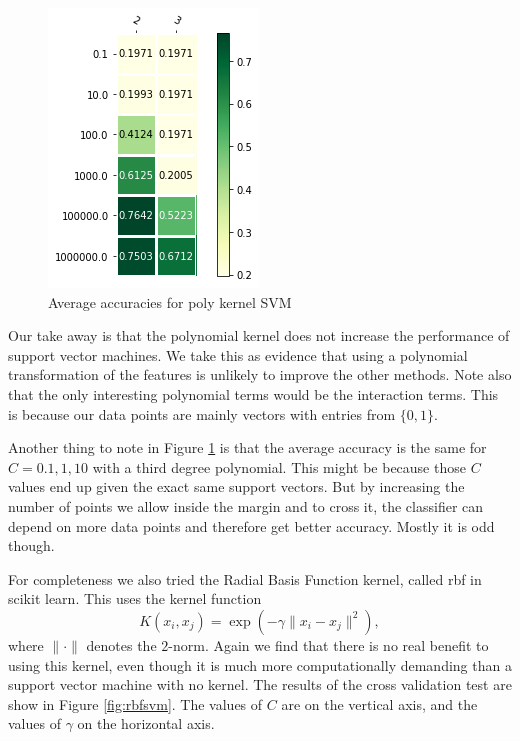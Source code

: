 \documentclass[parskip=half]{scrartcl}
\theoremstyle{definition}
\theoremstyle{remark}
\begin{document}
\begin{figure}[H]
\caption{Average accuracies for poly kernel SVM} \label{fig:polysvm}
\centering
\includegraphics[scale=0.6]{images/svm_poly.png}
\end{figure}

Our take away is that the polynomial kernel does not increase the performance of support vector machines. 
We take this as evidence that using a polynomial transformation of the features is unlikely to improve the other methods. 
Note also that the only interesting polynomial terms would be the interaction terms.
This is because our data points are mainly vectors with entries from $\{0,1\}$.

Another thing to note in Figure \ref{fig:polysvm} is that the average accuracy is the same for $C=0.1, 1, 10$ with a third degree polynomial. 
This might be because those $C$ values end up given the exact same support vectors. 
But by increasing the number of points we allow inside the margin and to cross it, the classifier can depend on more data points and therefore get better accuracy. 
Mostly it is odd though.  

For completeness we also tried the Radial Basis Function kernel, called rbf in scikit learn. 
This uses the kernel function
\[
 K(x_i, x_j) = \exp\left( -\gamma \|x_i - x_j\|^2 \right),
\]
where $\|\cdot\|$ denotes the $2$-norm. 
Again we find that there is no real benefit to using this kernel, even though it is much more computationally demanding than a support vector machine with no kernel.
The results of the cross validation test are show in Figure \ref{fig:rbfsvm}.
The values of $C$ are on the vertical axis, and the values of $\gamma$ on the horizontal axis. 
\end{document}
